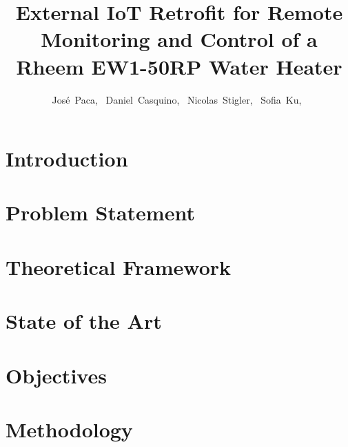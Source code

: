 \documentclass[journal]{IEEEtran}
\begin{document}
\title{External IoT Retrofit for Remote Monitoring and Control of a Rheem EW1-50RP Water Heater}

\author{José~Paca,~
  Daniel~Casquino,~
  Nicolas~Stigler,~
  Sofia~Ku,~
}

%

\maketitle

\IEEEpeerreviewmaketitle{}

\section{Introduction}


\section{Problem Statement}


\section{Theoretical Framework}


\section{State of the Art}


\section{Objectives}


\section{Methodology}


\ifCLASSOPTIONcaptionsoff{}
\newpage
\fi

\newpage


\end{document}
